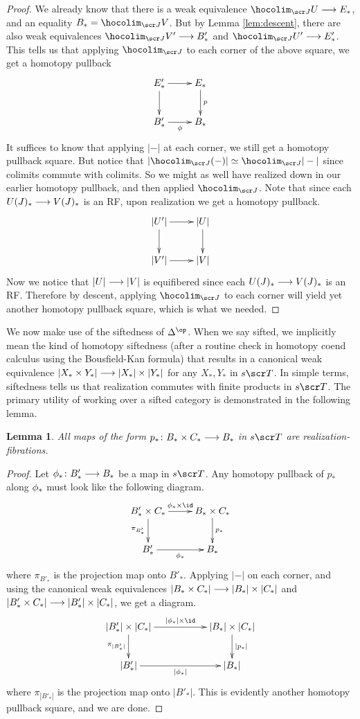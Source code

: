 \documentclass{amsart}
\newtheorem{lem}[thm]{Lemma}
\theoremstyle{definition}
\begin{document}
\begin{proof}
We already know that there is a weak equivalence $\hocolim_{\sJ} U \rtarr E_*$, and an equality $B_* = \hocolim_{\sJ} V$. But by Lemma \ref{lem:descent}, there are also weak equivalences $\hocolim_{\sJ}V' \rtarr B'_*$ and $\hocolim_{\sJ} U' \rtarr E'_*$. This tells us that applying $\hocolim_{\sJ}$ to each corner of the above square, 
we get a homotopy pullback 
\[\xymatrix{
    E'_* \ar[r] \ar[d] & E_* \ar[d]^{p}\\
    B'_* \ar[r]_{\ph} & B_*
}\]
\noindent It suffices to know that applying $|-|$ at each corner, we still get a homotopy pullback square. But notice that $|\hocolim_{\sJ} (-)| \simeq \hocolim_{\sJ} |-|$ since colimits commute with colimits. So we might as well have realized down in our earlier homotopy pullback, and then applied $\hocolim_{\sJ}$. Note that since each $U(J)_* \longrightarrow V(J)_*$ is an RF, upon realization we get a homotopy pullback.
\[
\xymatrix{
    |U'| \ar[r] \ar[d] & |U| \ar[d]\\
    |V'| \ar[r]& |V|
}
\]
\noindent Now we notice that $|U| \longrightarrow |V|$ is equifibered since each $U(J)_* \longrightarrow V(J)_*$ is an RF. Therefore by descent, applying $\hocolim_{\sJ}$ to each corner will yield yet another homotopy pullback square, which is what we needed. 
\end{proof}
\indent We now make use of the siftedness of $\DE^{\op}$. When we say sifted, we implicitly mean the kind of homotopy siftedness (after a routine check in homotopy coend calculus using the Bousfield-Kan formula) that results in a canonical weak equivalence $|X_* \times Y_*| \longrightarrow |X_*| \times |Y_*|$ for any $X_*, Y_*$ in $s\sT$.
In simple terms, siftedness tells us that realization commutes with finite products in $s\sT$. The primary utility of working over a sifted category is demonstrated in the following lemma.
\begin{lem}\label{lem:siftedprojection}
All maps of the form $p_* \colon B_* \times C_* \longrightarrow B_*$ in $s\sT$ are realization-fibrations.
\end{lem}
\begin{proof}
Let $\phi_* \colon B_*' \longrightarrow B_*$ be a map in $s\sT$. Any homotopy pullback of $p_*$ along $\phi_*$ must look like the following diagram.
\[
\xymatrix{
    B'_* \times C_* \ar[r]^{\ph_* \times \id} \ar[d]_{\pi_{B'_*}} & B_* \times C_* \ar[d]^{p_*}\\
    B'_* \ar[r]_{\ph_*} & B_*
}
\]
\noindent where $\pi_{B'_*}$ is the projection map onto $B'_*$. Applying $|-|$ on each corner, and using the canonical weak equivalences $|B_* \times C_*| \longrightarrow |B_*| \times |C_*|$ and $|B'_* \times C_*| \longrightarrow |B'_*| \times |C_*|$, we get a diagram.
\[
\xymatrix{
    |B'_*| \times |C_*| \ar[rr]^{|\ph_*|\times\id} \ar[d]_{\pi_{|B'_*|}} & & |B_*| \times |C_*| \ar[d]^{|p_*|}\\
    |B'_*| \ar[rr]_{|\ph_*|} && |B_*|
}
\]
\noindent where $\pi_{|B'_*|}$ is the projection map onto $|B'_*|$. This is evidently another homotopy pullback square, and we are done.
\end{proof}
\end{document}
